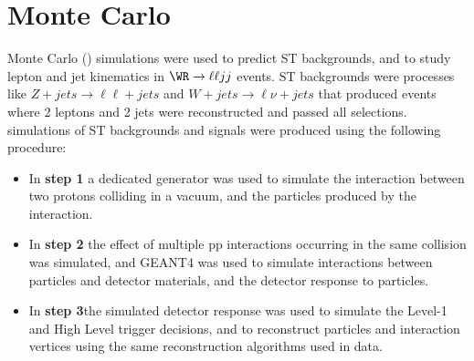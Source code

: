 
%


\section{Monte Carlo}
\label{sec:MC}
Monte Carlo (\MC) simulations were used to predict ST backgrounds, and to study lepton and jet kinematics 
in $\WR \rightarrow \ell\ell jj$ events.  ST backgrounds were processes like $Z+jets \rightarrow \ell\ell+jets$ 
and $W+jets \rightarrow \ell\nu+jets$ that produced events where 2 leptons and 2 jets were reconstructed 
and passed all selections.  \MC simulations of ST backgrounds and \WR signals were produced using the 
following procedure:

\begin{itemize}
	\item In \textbf{step 1} a dedicated \MC generator was used to simulate the interaction between two protons 
		colliding in a vacuum, and the particles produced by the interaction.
	\item In \textbf{step 2} the effect of multiple pp interactions occurring in the same collision was simulated, 
		and GEANT4 \cite{geant4} was used to simulate interactions between particles and detector materials, 
		and the detector response to particles.
	\item In \textbf{step 3}the simulated detector response was used to simulate the Level-1 and High Level 
		trigger decisions, and to reconstruct particles and interaction vertices using the same reconstruction 
		algorithms used in data.
\end{itemize}


